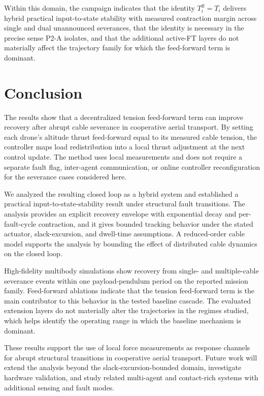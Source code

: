 \documentclass[lettersize,journal]{IEEEtran}
\begin{document}
Within this domain, the campaign indicates that the identity $T_i^{\mathrm{ff}}=T_i$ delivers hybrid practical input-to-state stability with measured contraction margin across single and dual unannounced severances, that the identity is necessary in the precise sense P2-A isolates, and that the additional active-FT layers do not materially affect the trajectory family for which the feed-forward term is dominant.


\section{Conclusion}
The results show that a decentralized tension feed-forward term can improve recovery after abrupt cable severance in cooperative aerial transport. By setting each drone's altitude thrust feed-forward equal to its measured cable tension, the controller maps load redistribution into a local thrust adjustment at the next control update. The method uses local measurements and does not require a separate fault flag, inter-agent communication, or online controller reconfiguration for the severance cases considered here.

We analyzed the resulting closed loop as a hybrid system and established a practical input-to-state-stability result under structural fault transitions. The analysis provides an explicit recovery envelope with exponential decay and per-fault-cycle contraction, and it gives bounded tracking behavior under the stated actuator, slack-excursion, and dwell-time assumptions. A reduced-order cable model supports the analysis by bounding the effect of distributed cable dynamics on the closed loop.

High-fidelity multibody simulations show recovery from single- and multiple-cable severance events within one payload-pendulum period on the reported mission family. Feed-forward ablations indicate that the tension feed-forward term is the main contributor to this behavior in the tested baseline cascade. The evaluated extension layers do not materially alter the trajectories in the regimes studied, which helps identify the operating range in which the baseline mechanism is dominant.

These results support the use of local force measurements as response channels for abrupt structural transitions in cooperative aerial transport. Future work will extend the analysis beyond the slack-excursion-bounded domain, investigate hardware validation, and study related multi-agent and contact-rich systems with additional sensing and fault modes.




\end{document}
